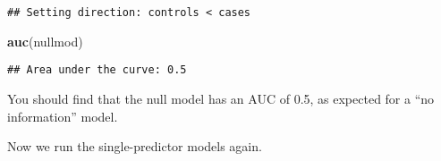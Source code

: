 \documentclass[]{article}
\newenvironment{Shaded}{\begin{snugshade}}{\end{snugshade}}
\newcommand{\KeywordTok}[1]{\textcolor[rgb]{0.13,0.29,0.53}{\textbf{#1}}}
\newcommand{\NormalTok}[1]{#1}
\begin{document}
\begin{verbatim}
## Setting direction: controls < cases
\end{verbatim}

\begin{Shaded}
\begin{Highlighting}[]
\KeywordTok{auc}\NormalTok{(nullmod)}
\end{Highlighting}
\end{Shaded}

\begin{verbatim}
## Area under the curve: 0.5
\end{verbatim}

You should find that the null model has an AUC of 0.5, as expected for a
``no information'' model.

Now we run the single-predictor models again.
\end{document}
